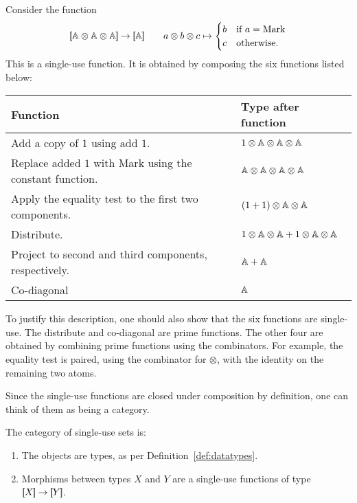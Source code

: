 \begin{example}\label{ex:six-compositions}
    Consider the function 
    \begin{align*}
    \sem{\atoms \otimes \atoms \otimes \atoms} \to \sem \atoms  \qquad a \otimes b \otimes c \mapsto \begin{cases}
        b & \text{if } a = \text{Mark} \\
        c & \text{otherwise}.
    \end{cases}
    \end{align*}
    This is a single-use function. It is obtained by composing the six functions listed below:

\begin{center}
    \begin{tabular}{ll}
        Function & Type after function \\
        \hline
        Add a copy of $1$ using $\text{add 1}$. & $1 \otimes \mathbb A \otimes \mathbb A \otimes \mathbb A$ \\
        Replace added $1$ with Mark using the constant function. & $\mathbb A \otimes \mathbb A \otimes \mathbb A \otimes \mathbb A$ \\
        Apply the equality test to the first two components. & $(1+1) \otimes \mathbb A \otimes \mathbb A$ \\
        Distribute. & $1 \otimes \mathbb A \otimes \mathbb A +  1 \otimes \mathbb A \otimes \mathbb A$ \\
        Project to second and third components, respectively. & $\mathbb A + \mathbb A$ \\
        Co-diagonal & $\mathbb A$ 
    \end{tabular}
\end{center}
To justify this description, one should also show that the six functions are single-use. The distribute and co-diagonal are prime functions. The other four are obtained by combining prime functions using the combinators. For example, the equality test is paired, using the combinator for $\otimes$, with the identity on the remaining two atoms. 
\end{example}


Since the single-use functions are closed under composition by definition, one can think of them as being a category. 


\begin{definition}\label{def:single-use-category}
    The category of single-use sets is:
    \begin{enumerate}
        \item The objects are types, as per Definition~\ref{def:datatypes}.
        \item Morphisms between types $X$ and $Y$ are a single-use functions of type $\sem X \to \sem Y$.
    \end{enumerate}
\end{definition}


